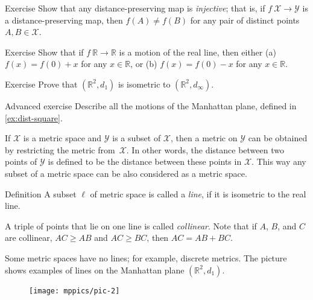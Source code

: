 \begin{thm}{Exercise}\label{ex:dist-preserv=>injective}
Show that any distance-preserving map is \emph{injective};
that is, if $f\:\mathcal X\to\mathcal Y$ is a distance-preserving map, 
then $f(A)\ne f(B)$ for any pair of distinct points $A, B\in \mathcal X$.
\end{thm}

\begin{thm}{Exercise}\label{ex:motion-of-R}
Show that if $f\:\mathbb{R}\to\mathbb{R}$ is a motion of the real line,
then either (a)
$f(x)=f(0)+x$ for any $x\in \mathbb{R}$, 
or (b)
$f(x)=f(0)-x$ for any $x\in \mathbb{R}$. 

\end{thm}

\begin{thm}{Exercise}\label{ex:d_1=d_infty}
Prove that $(\mathbb{R}^2,d_1)$ is isometric to $(\mathbb{R}^2,d_\infty)$.
\end{thm}

\begin{thm}{Advanced exercise}\label{ad-ex:motions of Manhattan plane}
Describe all the motions of the Manhattan plane, defined in \ref{ex:dist-square}.
\end{thm}

If $\mathcal X$ is a metric space and $\mathcal Y$ is a subset of $\mathcal X$,
then a metric on $\mathcal Y$ can be obtained by restricting the metric from~$\mathcal X$. 
In other words, 
the distance between two points of $\mathcal Y$ is defined to be the distance between these points in $\mathcal X$.
This way any subset of a metric space can be also considered as a metric space. 

\begin{thm}{Definition}\label{def:line}
A subset $\ell$ of metric space is called a \emph{line}, if it is isometric to the real line.
\end{thm}

A triple of points that lie on one line is called \emph{collinear}.
Note that if $A$, $B$, and  $C$ are  collinear, $AC\ge AB$ and $AC\ge BC$, then $AC= AB+BC$.

Some metric spaces have no lines; for example, discrete metrics.
The picture shows examples of lines on the Manhattan plane $(\mathbb{R}^2,d_1)$. 
\begin{figure}[!ht]
\centering
\texttt{[image: mppics/pic-2]}
\end{figure}

